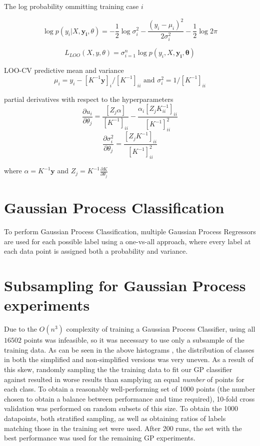 The log probability ommitting training case $i$

$$\log p(y_i|X, \mathbf{y_i}, \theta) = -\frac{1}{2}\log\sigma^2_i - \frac{(y_i - \mu_i)^2}{2 \sigma^2_i} - \frac{1}{2}\log2\pi$$

$$ L_{LOO}(X, y, \theta) = \sigma^n_{i=1} \log p(y_i, X, \mathbf{y_i}, \mathbf{\theta})$$

LOO-CV predictive mean and variance
$$\mu_i= y_i - [K^{-1}\mathbf{y}]_i / [K^{-1}]_{ii} \text{ and } \sigma_i^2 = 1/[K^{-1}]_{ii}$$

partial derivatives with respect to the hyperparameters
$$\frac{\partial{u_i}}{\partial{\theta_j}} = \frac{[Z_j \alpha]}{[K^{-1}]_{ii}} - \frac{\alpha_i[Z_j K^{-1}_{ii}]_{ii}}{[K^{-1}]^2_{ii}}$$
$$\frac{\partial{\sigma_i^2}}{\partial{\theta_j}} = \frac{[Z_jK^{-1}]_{ii}}{[K^{-1}]^2_{ii}}$$

where $\alpha = K^{-1}\mathbf{y}$ and $Z_j = K^{-1} \frac{\partial{K}}{\partial{\theta_j}}$


\section{Gaussian Process Classification} \label{chapsec:gpc}

To perform Gaussian Process Classification, multiple Gaussian Process Regressors are used for each possible label using a one-vs-all approach, where every label at each data point is assigned both a probability and variance.


\section{Subsampling for Gaussian Process experiments}

Due to the $O(n^3)$ complexity of training a Gaussian Process Classifier, using all $16502$ points was infeasible, so it was necessary to use only a subsample of the training data. As can be seen in the above histograms , the distribution of classes in both the simplified and non-simplified versions was very uneven. As a result of this skew, randomly sampling the the training data to fit our GP classifier against resulted in worse results than samplying an equal \textit{number} of points for each class. To obtain a reasonably well-performing set of 1000 points (the number chosen to obtain a balance between performance and time required), 10-fold cross validation was performed on random subsets of this size. To obtain the 1000 datapoints, both stratified sampling, as well as obtaining ratios of labels matching those in the training set were used. After 200 runs, the set with the best performance was used for the remaining GP experiments.

